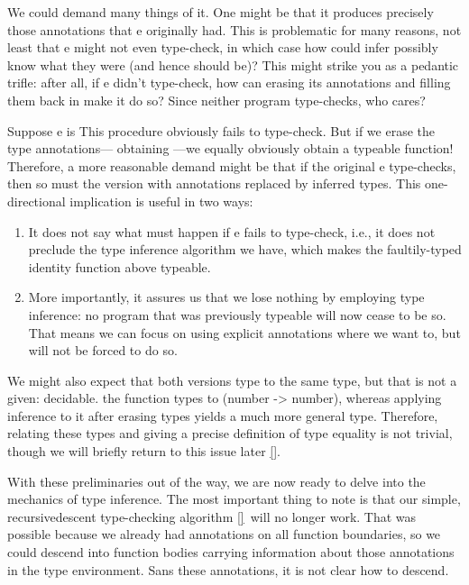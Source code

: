 We could demand many things of it. One might be that it produces precisely those
annotations that e originally had. This is problematic for many reasons, not
least that e might not even type-check, in which case how could infer possibly
know what they were (and hence should be)? This might strike you as a pedantic
trifle: after all, if e didn’t type-check, how can erasing its annotations and
filling them back in make it do so? Since neither program type-checks, who
cares?


Suppose e is
This procedure obviously fails to type-check. But if we erase the type
annotations— obtaining
—we equally obviously obtain a typeable function! Therefore, a more reasonable
demand might be that if the original e type-checks, then so must the version
with annotations replaced by inferred types. This one-directional implication is
useful in two ways:
\begin{enumerate}
  \item 
It does not say what must happen if e fails to type-check, i.e., it does not
preclude the type inference algorithm we have, which makes the faultily-typed
identity function above typeable.
  \item 
More importantly, it assures us that we lose nothing by employing type
inference: no program that was previously typeable will now cease to be so. That
means we can focus on using explicit annotations where we want to, but will not
be forced to do so.
\end{enumerate}
We might also expect that both versions type to the same type, but that is not a
given: decidable.
the function
types to (number -> number), whereas applying inference to it after erasing
types yields a much more general type. Therefore, relating these types and
giving a precise definition of type equality is not trivial, though we will
briefly return to this issue later
\ref{}.

With these preliminaries out of the way, we are now ready to delve into the
mechanics of type inference. The most important thing to note is that our
simple, recursivedescent type-checking algorithm \ref{}\ will no longer work.
That was possible because we already had annotations on all function boundaries,
so we could descend into function bodies carrying information about those
annotations in the type environment. Sans these annotations, it is not clear how
to descend.

